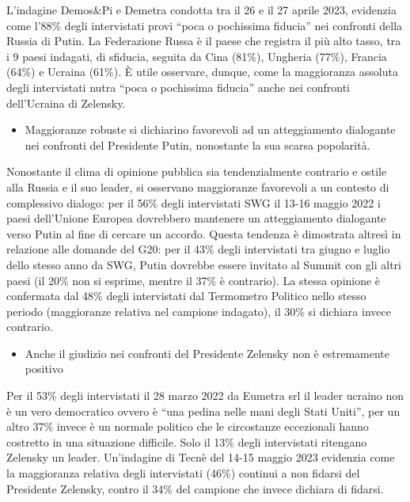 \documentclass[
  openany]{book}
\providecommand{\tightlist}{%
  \setlength{\itemsep}{0pt}\setlength{\parskip}{0pt}}
\begin{document}
L'indagine Demos\&Pi e Demetra condotta tra il 26 e il 27 aprile 2023, evidenzia come l'88\% degli intervistati provi ``poca o pochissima fiducia'' nei confronti della Russia di Putin. La Federazione Russa è il paese che registra il più alto tasso, tra i 9 paesi indagati, di sfiducia, seguita da Cina (81\%), Ungheria (77\%), Francia (64\%) e Ucraina (61\%). È utile osservare, dunque, come la maggioranza assoluta degli intervistati nutra ``poca o pochissima fiducia'' anche nei confronti dell'Ucraina di Zelensky.

\begin{itemize}
\tightlist
\item
  Maggioranze robuste si dichiarino favorevoli ad un atteggiamento dialogante nei confronti del Presidente Putin, nonostante la sua scarsa popolarità.
\end{itemize}

Nonostante il clima di opinione pubblica sia tendenzialmente contrario e ostile alla Russia e il suo leader, si osservano maggioranze favorevoli a un contesto di complessivo dialogo: per il 56\% degli intervistati SWG il 13-16 maggio 2022 i paesi dell'Unione Europea dovrebbero mantenere un atteggiamento dialogante verso Putin al fine di cercare un accordo. Questa tendenza è dimostrata altresì in relazione alle domande del G20: per il 43\% degli intervistati tra giugno e luglio dello stesso anno da SWG, Putin dovrebbe essere invitato al Summit con gli altri paesi (il 20\% non si esprime, mentre il 37\% è contrario). La stessa opinione è confermata dal 48\% degli intervistati dal Termometro Politico nello stesso periodo (maggioranze relativa nel campione indagato), il 30\% si dichiara invece contrario.

\begin{itemize}
\tightlist
\item
  Anche il giudizio nei confronti del Presidente Zelensky non è estremamente positivo
\end{itemize}

Per il 53\% degli intervistati il 28 marzo 2022 da Eumetra srl il leader ucraino non è un vero democratico ovvero è ``una pedina nelle mani degli Stati Uniti'', per un altro 37\% invece è un normale politico che le circostanze eccezionali hanno costretto in una situazione difficile. Solo il 13\% degli intervistati ritengano Zelensky un leader. Un'indagine di Tecnè del 14-15 maggio 2023 evidenzia come la maggioranza relativa degli intervistati (46\%) continui a non fidarsi del Presidente Zelensky, contro il 34\% del campione che invece dichiara di fidarsi.
\end{document}
